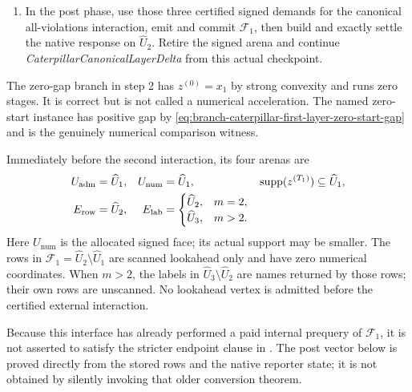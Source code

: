 \begin{definition}
\begin{enumerate}
       Stop before the second external interaction, carrying the signed
       endpoint, the scalar certificate, the paid rows, and the common
       admitted checkpoint $\widehat U_1$.
 \item In the post phase, use those three certified signed demands for the
       canonical all-violations interaction, emit and commit
       $\mathcal F_1$, then build and exactly settle the native response on
       $\widehat U_2$.  Retire the signed arena and continue
       \emph{CaterpillarCanonicalLayerDelta} from this actual checkpoint.
\end{enumerate}
The zero-gap branch in step 2 has $z^{(0)}=x_1$ by strong convexity and runs
zero stages.  It is correct but is not called a numerical acceleration.  The
named zero-start instance has positive gap by
\cref{eq:branch-caterpillar-first-layer-zero-start-gap} and is the genuinely
numerical comparison witness.
\end{definition}

Immediately before the second interaction, its four arenas are
\begin{equation}
 \begin{aligned}
 U_{\mathrm{adm}}&=\widehat U_1,
 &U_{\mathrm{num}}&=\widehat U_1,
 &\operatorname{supp}(z^{(T_1)})&\subseteq\widehat U_1,\\
 E_{\mathrm{row}}&=\widehat U_2,
 &E_{\mathrm{lab}}&=
 \begin{cases}
  \widehat U_2,&m=2,\\
  \widehat U_3,&m>2.
 \end{cases}
 \end{aligned}
 \label{eq:branch-caterpillar-first-layer-numerical-arenas}
\end{equation}
Here $U_{\mathrm{num}}$ is the allocated signed face; its actual support may
be smaller.  The rows in $\mathcal F_1=\widehat U_2\setminus\widehat U_1$
are scanned lookahead only and have zero numerical coordinates.  When $m>2$,
the labels in $\widehat U_3\setminus\widehat U_2$ are names returned by those
rows; their own rows are unscanned.  No lookahead vertex is admitted before
the certified external interaction.

Because this interface has already performed a paid internal prequery of
$\mathcal F_1$, it is not asserted to satisfy the stricter endpoint clause in
.  The post vector
below is proved directly from the stored rows and the native reporter state;
it is not obtained by silently invoking that older conversion theorem.

